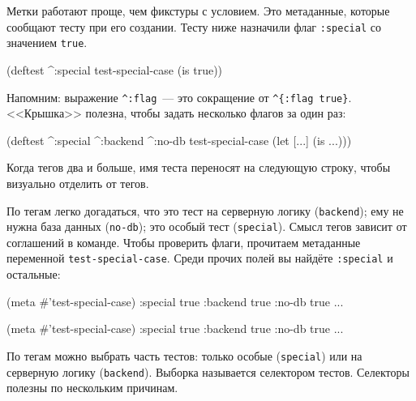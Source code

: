 Метки работают проще, чем фикстуры с условием. Это метаданные, которые сообщают
тесту при его создании. Тесту ниже назначили флаг \verb|:special| со значением
\verb|true|.

\begin{english}
  \begin{clojure}
(deftest ^:special test-special-case
  (is true))
  \end{clojure}
\end{english}


Напомним: выражение \verb|^:flag|~--- это сокращение от \verb|^{:flag true}|.
<<Крышка>> полезна, чтобы задать несколько флагов за один раз:

\begin{english}
  \begin{clojure}
(deftest ^:special ^:backend ^:no-db
  test-special-case
  (let [...]
    (is ...)))
  \end{clojure}
\end{english}

\noindent
Когда тегов два и больше, имя теста переносят на следующую строку, чтобы
визуально отделить от тегов.

По тегам легко догадаться, что это тест на серверную логику (\verb|backend|);
ему не нужна база данных (\verb|no-db|); это особый тест (\verb|special|). Смысл
тегов зависит от соглашений в команде. Чтобы проверить флаги, прочитаем
метаданные переменной \verb|test-special-case|. Среди прочих полей вы найдёте
\verb|:special| и остальные:

\ifx\devicetype\mobile

\begin{english}
  \begin{clojure}
(meta #'test-special-case)
{:special true
 :backend true
 :no-db true ...}
  \end{clojure}
\end{english}

\else

\begin{english}
  \begin{clojure}
(meta #'test-special-case)
{:special true :backend true :no-db true ...}
  \end{clojure}
\end{english}

\fi

По тегам можно выбрать часть тестов: только особые (\verb|special|) или на
серверную логику (\verb|backend|). Выборка называется селектором
тестов. Селекторы полезны по нескольким причинам.


